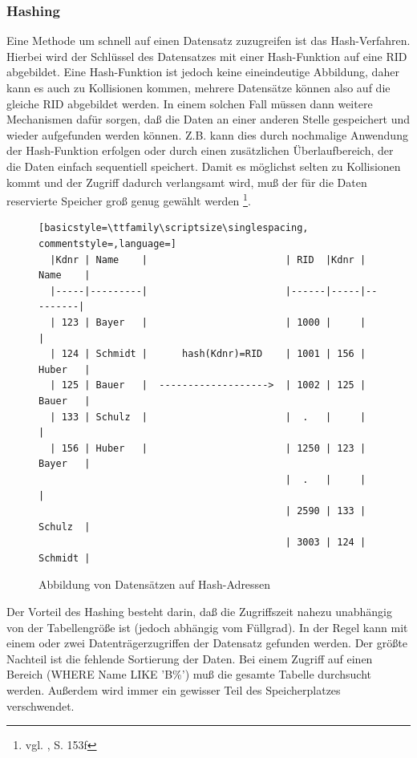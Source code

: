 \subsubsection{Hashing}
Eine Methode um schnell auf einen Datensatz zuzugreifen ist das Hash-Verfahren. Hierbei wird der Schlüssel des Datensatzes mit einer Hash-Funktion auf eine RID abgebildet. Eine Hash-Funktion ist jedoch keine eineindeutige Abbildung, daher kann es auch zu Kollisionen kommen, mehrere Datensätze können also auf die gleiche RID abgebildet werden. In einem solchen Fall müssen dann weitere Mechanismen dafür sorgen, daß die Daten an einer anderen Stelle gespeichert und wieder aufgefunden werden können. Z.B. kann dies durch nochmalige Anwendung der Hash-Funktion erfolgen oder durch einen zusätzlichen Überlaufbereich, der die Daten einfach sequentiell speichert. Damit es möglichst selten zu Kollisionen kommt und der Zugriff dadurch verlangsamt wird, muß der für die Daten reservierte Speicher groß genug gewählt werden  \footnote{vgl. \cite{Sauer1998}, S. 153f}.
\begin{figure}[h]
\begin{lstlisting}[basicstyle=\ttfamily\scriptsize\singlespacing, commentstyle=,language=]
  |Kdnr | Name    |                        | RID  |Kdnr | Name    |
  |-----|---------|                        |------|-----|---------|
  | 123 | Bayer   |                        | 1000 |     |         |
  | 124 | Schmidt |      hash(Kdnr)=RID    | 1001 | 156 | Huber   |
  | 125 | Bauer   |  ------------------->  | 1002 | 125 | Bauer   |
  | 133 | Schulz  |                        |  .   |     |         |
  | 156 | Huber   |                        | 1250 | 123 | Bayer   |
                                           |  .   |     |         |
                                           | 2590 | 133 | Schulz  |
                                           | 3003 | 124 | Schmidt |
\end{lstlisting}
\caption[Abbildung von Datensätzen auf Hash-Adressen]{Abbildung von Datensätzen auf Hash-Adressen \footnotemark}
\label{hash}
\end{figure}
Der Vorteil des Hashing besteht darin, daß die Zugriffszeit nahezu unabhängig von der Tabellengröße ist (jedoch abhängig vom Füllgrad). In der Regel kann mit einem oder zwei Datenträgerzugriffen der Datensatz gefunden werden.
Der größte Nachteil ist die fehlende Sortierung der Daten. Bei einem Zugriff auf einen Bereich (WHERE Name LIKE 'B\%') muß die gesamte Tabelle durchsucht werden. Außerdem wird immer ein gewisser Teil des Speicherplatzes verschwendet.

